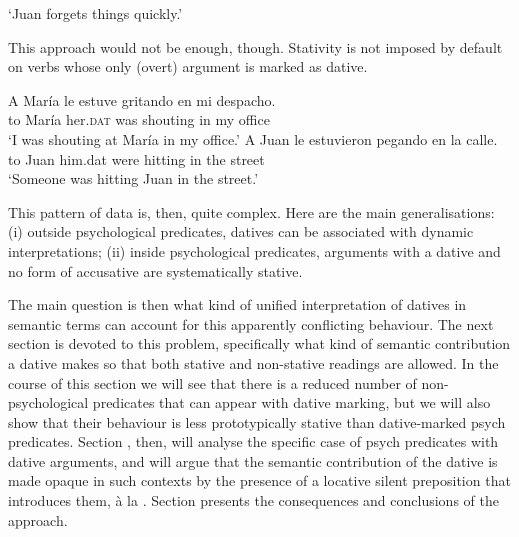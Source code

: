 \documentclass[output=paper,colorlinks,citecolor=brown,nonflat]{langsci/langscibook}
\begin{document}
    \glt `Juan forgets things quickly.'
    \z

This approach would not be enough, though. Stativity is not imposed by default on verbs whose only (overt) argument \citep{Pineda2016, Pineda2019} is marked as dative.

\ea%
    \label{ex:fabregas:12}
    \ea\label{ex:fabregas:12a}
    \gll    A María le       estuve   gritando en mi despacho.\\
            {to} {María} {her.}\textsc{dat}   {was}      {shouting} {in} {my} {office}\\
    \glt `I was shouting at María in my office.'
    \ex\label{ex:fabregas:12b}
    \gll    A Juan le       estuvieron   pegando en la calle.\\
            {to} {Juan} {him.dat}   {were}          {hitting}    {in} {the} {street}\\
    \glt `Someone was hitting Juan in the street.'
    \z
\z

This pattern of data is, then, quite complex. Here are the main generalisations: (i) outside psychological predicates, datives can be associated with dynamic interpretations; (ii) inside psychological predicates, arguments with a dative and no form of accusative are systematically stative.

The main question is then what kind of unified interpretation of datives in semantic terms can account for this apparently conflicting behaviour. The next section is devoted to this problem, specifically what kind of semantic contribution a dative makes so that both stative and non-stative readings are allowed. In the course of this section we will see that there is a reduced number of non-psychological predicates that can appear with dative marking, but we will also show that their behaviour is less prototypically stative than dative-marked psych predicates. Section , then, will analyse the specific case of psych predicates with dative arguments, and will argue that the semantic contribution of the dative is made opaque in such contexts by the presence of a locative silent preposition that introduces them, à la \citet{Landau2010}. Section  presents the consequences and conclusions of the approach.
\end{document}
